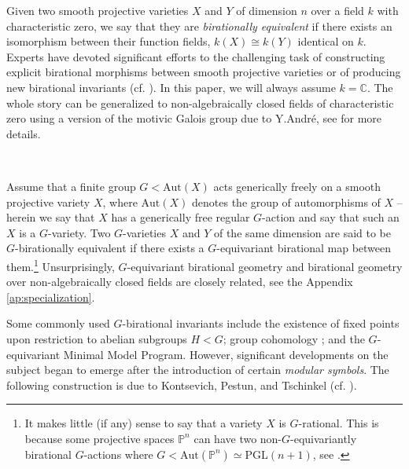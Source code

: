 \documentclass[12pt,a4paper]{amsart}
\theoremstyle{definition}
\theoremstyle{remark}
\newcommand{\C}{\mathbb{C}}
\begin{document}
Given two smooth projective varieties \( X \) and \( Y \) of dimension \( n \) over a field \( k \) with characteristic zero, we say that they are \emph{birationally equivalent} if there exists an isomorphism between their function fields, \( k(X) \cong k(Y) \) identical on $k$. Experts have devoted significant efforts to the challenging task of constructing explicit birational morphisms between smooth projective varieties or of producing new birational invariants (cf. \cites{kresch2026invariantsequivariantbirationalgeometry,bira-book-2020, birkar2017birationalgeometryalgebraicvarieties, birkar2012lecturesbirationalgeometry, bira-book-2023, Voisin_2002, Voisin2014, Voisin2016StableBI, Voisin2019}). In this paper, we will always assume $k=\C$. The whole story can be generalized to non-algebraically closed fields of characteristic zero using a version of the motivic Galois group due to Y.Andr\'{e}, see \cite{katzarkovpantevyu} for more details.

\  

Assume that a finite group \( G < \mathrm{Aut}(X) \) acts generically freely on a smooth projective variety \( X \), where \( \mathrm{Aut}(X) \) denotes the group of automorphisms of \( X \) -- herein we say that $X$ has a generically free regular $G$-action and say that such an $X$ is a $G$-variety. Two $G$-varieties \( X \) and \( Y \) of the same dimension are said to be \( G \)-birationally equivalent if there exists a \( G \)-equivariant birational map between them.\footnote{It makes little (if any) sense to say that a variety \( X \) is \( G \)-rational. This is because some projective spaces \( \mathbb{P}^n \) can have two non-\( G \)-equivariantly birational \( G \)-actions where \( G < \mathrm{Aut}(\mathbb{P}^n)\simeq \mathrm{PGL}(n+1) \), see \cite{Reichstein2002}.} Unsurprisingly, $G$-equivariant birational geometry and birational geometry over non-algebraically closed fields are closely related, see the Appendix \ref{ap:specialization}.

Some commonly used \( G \)-birational invariants include the existence of fixed points upon restriction to abelian subgroups \( H < G \); group cohomology \cites{Bogomolov2013, Prokhorov}; and the \( G \)-equivariant Minimal Model Program. However, significant developments on the subject began to emerge after the introduction of certain \emph{modular symbols}. The following construction is due to Kontsevich, Pestun, and Tschinkel (cf. \cite{kontsevich2021equivariant}).
\end{document}
